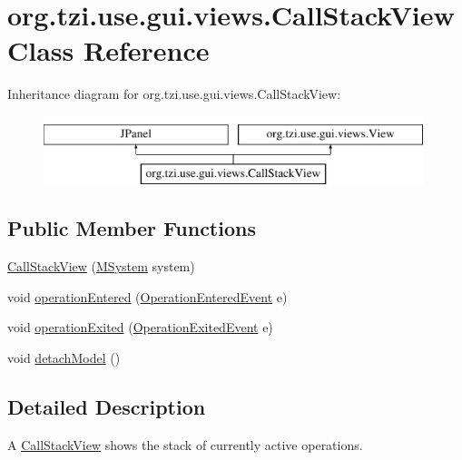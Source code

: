 \hypertarget{classorg_1_1tzi_1_1use_1_1gui_1_1views_1_1_call_stack_view}{\section{org.\-tzi.\-use.\-gui.\-views.\-Call\-Stack\-View Class Reference}
\label{classorg_1_1tzi_1_1use_1_1gui_1_1views_1_1_call_stack_view}
}
Inheritance diagram for org.\-tzi.\-use.\-gui.\-views.\-Call\-Stack\-View\-:\begin{figure}[H]
\begin{center}
\leavevmode
\includegraphics[height=2.000000cm]{classorg_1_1tzi_1_1use_1_1gui_1_1views_1_1_call_stack_view}
\end{center}
\end{figure}
\subsection*{Public Member Functions}
\begin{DoxyCompactItemize}
\item 
\hyperlink{classorg_1_1tzi_1_1use_1_1gui_1_1views_1_1_call_stack_view_a7713c765e4edfc00bd8b5df910310c30}{Call\-Stack\-View} (\hyperlink{classorg_1_1tzi_1_1use_1_1uml_1_1sys_1_1_m_system}{M\-System} system)
\item 
void \hyperlink{classorg_1_1tzi_1_1use_1_1gui_1_1views_1_1_call_stack_view_a935bdca0c272cd154215fa8db13869ba}{operation\-Entered} (\hyperlink{classorg_1_1tzi_1_1use_1_1uml_1_1sys_1_1events_1_1_operation_entered_event}{Operation\-Entered\-Event} e)
\item 
void \hyperlink{classorg_1_1tzi_1_1use_1_1gui_1_1views_1_1_call_stack_view_a75f5059e678a4aebd3e49c9e9f293057}{operation\-Exited} (\hyperlink{classorg_1_1tzi_1_1use_1_1uml_1_1sys_1_1events_1_1_operation_exited_event}{Operation\-Exited\-Event} e)
\item 
void \hyperlink{classorg_1_1tzi_1_1use_1_1gui_1_1views_1_1_call_stack_view_a816d2572682dd7f1050bb740ce059d3f}{detach\-Model} ()
\end{DoxyCompactItemize}


\subsection{Detailed Description}
A \hyperlink{classorg_1_1tzi_1_1use_1_1gui_1_1views_1_1_call_stack_view}{Call\-Stack\-View} shows the stack of currently active operations.

